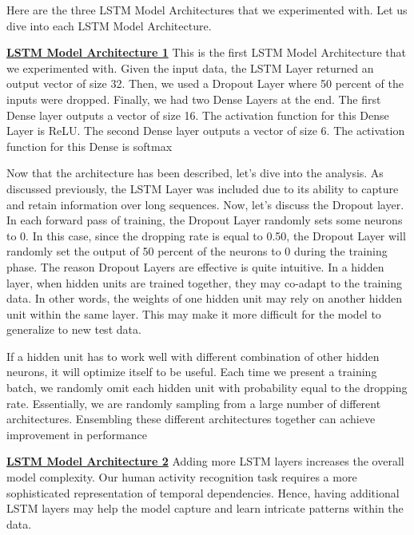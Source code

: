 \documentclass[conference]{IEEEtran}
\begin{document}
Here are the three LSTM Model Architectures that we experimented with. Let us dive into each LSTM Model Architecture. 

\textbf{\underline{LSTM Model Architecture 1}} \newline 
This is the first LSTM Model Architecture that we experimented with. Given the input data, the LSTM Layer returned an output vector of size 32. Then, we used a Dropout Layer where 50 percent of the inputs were dropped. Finally, we had two Dense Layers at the end. The first Dense layer outputs a vector of size 16. The activation function for this Dense Layer is ReLU. The second Dense layer outputs a vector of size 6. The activation function for this Dense is softmax \newline 

Now that the architecture has been described, let's dive into the analysis. As discussed previously, the LSTM Layer was included due to its ability to capture and retain information over long sequences. Now, let's discuss the Dropout layer. In each forward pass of training, the Dropout Layer randomly sets some neurons to 0. In this case, since the dropping rate is equal to 0.50, the Dropout Layer will randomly set the output of 50 percent of the neurons to 0 during the training phase. The reason Dropout Layers are effective is quite intuitive. In a hidden layer, when hidden units are trained together, they may co-adapt to the training data. In other words, the weights of one hidden unit may rely on another hidden unit within the same layer. This may make it more difficult for the model to generalize to new test data. \newline 

If a hidden unit has to work well with different combination of other hidden neurons, it will optimize itself to be useful. Each time we present a training batch, we randomly omit each hidden unit with probability equal to the dropping rate. Essentially, we are randomly sampling from a large number of different architectures. Ensembling these different architectures together can achieve improvement in performance \newline 

 
\textbf{\underline{LSTM Model Architecture 2}} \newline 
Adding more LSTM layers increases the overall model complexity. Our human activity recognition task requires a more sophisticated representation of temporal dependencies. Hence, having additional LSTM layers may help the model capture and learn intricate patterns within the data. \newline 
\end{document}
